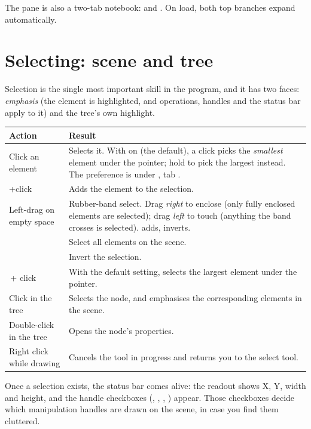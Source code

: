 \noindent The pane is also a two-tab notebook:  and
. On load, both top branches expand automatically.

\section{Selecting: scene and tree}

Selection is the single most important skill in the program, and it has two
faces: \emph{emphasis} (the element is highlighted, and operations, handles and
the status bar apply to it) and the tree's own highlight.

\begin{center}\small
\begin{tabular}{@{}L{4.5cm}L{9.7cm}@{}}
\toprule
\textbf{Action} & \textbf{Result} \\
\midrule
Click an element & Selects it. With  on
(the default), a click picks the \emph{smallest} element under the pointer;
hold  to pick the largest instead. The preference is under
, tab . \\
+click & Adds the element to the selection. \\
Left-drag on empty space & Rubber-band select. Drag \emph{right} to enclose
(only fully enclosed elements are selected); drag \emph{left} to touch
(anything the band crosses is selected).  adds,  inverts. \\
 & Select all elements on the scene. \\
 & Invert the selection. \\
\,+ click & With the default setting, selects the largest element under
the pointer. \\
Click in the tree & Selects the node, and emphasises the corresponding elements
in the scene. \\
Double-click in the tree & Opens the node's properties. \\
Right click while drawing & Cancels the tool in progress and returns you to the
select tool. \\
\bottomrule
\end{tabular}
\end{center}

\noindent Once a selection exists, the status bar comes alive: the
 readout shows X, Y, width and height, and the handle checkboxes
(, , , ) appear. Those checkboxes
decide which manipulation handles are drawn on the scene, in case you find them
cluttered.

